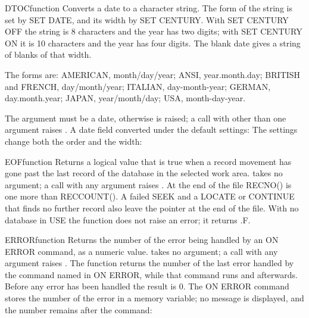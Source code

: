 \begin{XbaseEntry}{DTOC}{function}
Converts a date to a character string.
\Syntax
{}
\Usage
The form of the string is set by SET DATE, and its width by SET CENTURY. With SET CENTURY OFF the string is 8 characters and the year has two digits; with SET CENTURY ON it is 10 characters and the year has four digits. The blank date gives a string of blanks of that width.

The forms are: AMERICAN, month/day/year; ANSI, year.month.day; BRITISH and FRENCH, day/month/year; ITALIAN, day-month-year; GERMAN, day.month.year; JAPAN, year/month/day; USA, month-day-year.

The argument must be a date, otherwise  is raised; a call with other than one argument raises .
\Examples
A date field converted under the default settings:
The settings change both the order and the width:
\end{XbaseEntry}

\begin{XbaseEntry}{EOF}{function}
Returns a logical value that is true when a record movement has gone past the last record of the database in the selected work area.
\Syntax
{}
\Usage
{} takes no argument; a call with any argument raises . At the end of the file RECNO() is one more than RECCOUNT(). A failed SEEK and a LOCATE or CONTINUE that finds no further record also leave the pointer at the end of the file. With no database in USE the function does not raise an error; it returns .F.
\Examples
{}
\end{XbaseEntry}

\begin{XbaseEntry}{ERROR}{function}
Returns the number of the error being handled by an ON ERROR command, as a numeric value.
\Syntax
{}
\Usage
{} takes no argument; a call with any argument raises . The function returns the number of the last error handled by the command named in ON ERROR, while that command runs and afterwards. Before any error has been handled the result is 0.
\Examples
The ON ERROR command stores the number of the error in a memory variable; no message is displayed, and the number remains after the command:
\end{XbaseEntry}

